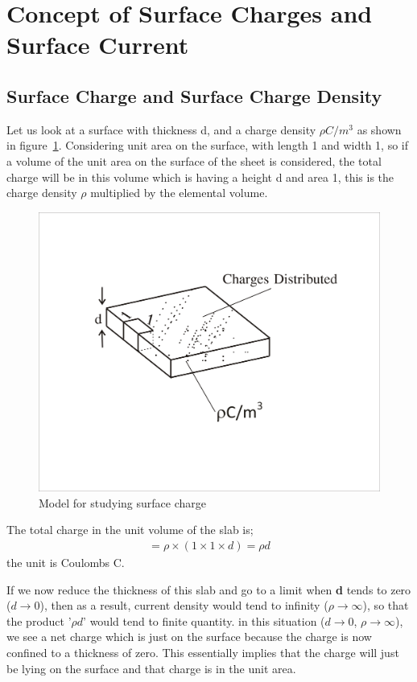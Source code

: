 \section{Concept of Surface Charges and Surface Current}

\subsection{Surface Charge and Surface Charge Density}
Let us look at a surface with thickness d, and a charge density $\rho$$C/m^{3}$ as shown in figure~\ref{fig:surfacecharge}. Considering unit area on the surface, with length 1 and width 1, so if a volume of the unit area on the surface of the sheet is considered, the total charge will be in this volume which is having a height d and area 1, this is the charge density $\rho$ multiplied by the elemental volume.

\begin{figure}[h]
	\centering
	\includegraphics[width=.7\linewidth]{graphics/surfacecharge}
	\caption{Model for studying surface charge}
	\label{fig:surfacecharge}
\end{figure} 

The total charge in the unit volume of the slab is;
\begin{align*}
	=\rho\times(1\times 1\times d)=\rho d
\end{align*}
the unit is Coulombs C.

If we now reduce the thickness of this slab and go to a limit when \textbf{d} tends to zero ($d\rightarrow 0$), then as a result, current density would tend to infinity ($\rho\rightarrow\infty$), so that the product '$\rho d$' would tend to finite quantity. in this situation ($d\rightarrow 0$, $\rho\rightarrow\infty$), we see a net charge which is just on the surface because the charge is now confined to a thickness of zero. This essentially implies that the charge will just be lying on the surface and that charge is in the unit area. 


